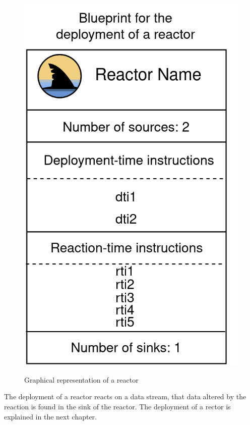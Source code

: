 \documentclass[a4paper]{book}
\begin{document}
\begin{figure}[h]
	\caption{Graphical representation of a reactor}
	\includegraphics[scale=0.2]{reactor300.drawio}
	\centering
	\label{fig:reactor}
\end{figure}

The deployment of a reactor reacts on a data stream, that data altered by the reaction is found in the sink of the reactor. The deployment of a rector is explained in the next chapter.
\end{document}
